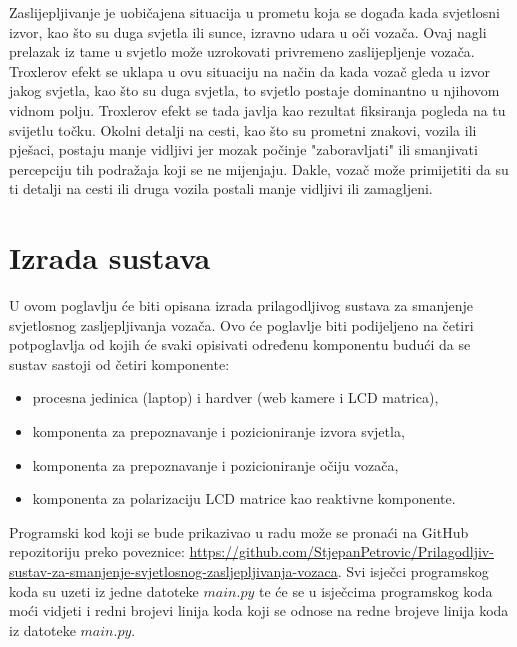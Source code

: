 \documentclass{foi}
\begin{document}
Zaslijepljivanje je uobičajena situacija u prometu koja se događa kada svjetlosni izvor, kao što su duga svjetla ili sunce, izravno udara u oči vozača. Ovaj nagli prelazak iz tame u svjetlo može uzrokovati privremeno zaslijepljenje vozača. Troxlerov efekt se uklapa u ovu situaciju na način da kada vozač gleda u izvor jakog svjetla, kao što su duga svjetla, to svjetlo postaje dominantno u njihovom vidnom polju. Troxlerov efekt se tada javlja kao rezultat fiksiranja pogleda na tu svijetlu točku. Okolni detalji na cesti, kao što su prometni znakovi, vozila ili pješaci, postaju manje vidljivi jer mozak počinje "zaboravljati" ili smanjivati percepciju tih podražaja koji se ne mijenjaju. Dakle, vozač može primijetiti da su ti detalji na cesti ili druga vozila postali manje vidljivi ili zamagljeni. \cite{Autoevolution2022}

\chapter{Izrada sustava}

U ovom poglavlju će biti opisana izrada prilagodljivog sustava za smanjenje svjetlosnog zasljepljivanja vozača. Ovo će poglavlje biti podijeljeno na četiri potpoglavlja od kojih će svaki opisivati određenu komponentu budući da se sustav sastoji od četiri komponente:
\begin{itemize}[noitemsep]
    \item procesna jedinica (laptop) i hardver (web kamere i LCD matrica),
    \item komponenta za prepoznavanje i pozicioniranje izvora svjetla,
    \item komponenta za prepoznavanje i pozicioniranje očiju vozača,
    \item komponenta za polarizaciju LCD matrice kao reaktivne komponente.
\end{itemize}

Programski kod koji se bude prikazivao u radu može se pronaći na GitHub repozitoriju preko poveznice: \href{https://github.com/StjepanPetrovic/Prilagodljiv-sustav-za-smanjenje-svjetlosnog-zasljepljivanja-vozaca}{https://github.com/StjepanPetrovic/Prilagodljiv-sustav-za-smanjenje-svjetlosnog-zasljepljivanja-vozaca}. Svi isječci programskog koda su uzeti iz jedne datoteke \href{https://github.com/StjepanPetrovic/Prilagodljiv-sustav-za-smanjenje-svjetlosnog-zasljepljivanja-vozaca/blob/main/development/main.py}{$main.py$} te će se u isječcima programskog koda moći vidjeti i redni brojevi linija koda koji se odnose na redne brojeve linija koda iz datoteke \href{https://github.com/StjepanPetrovic/Prilagodljiv-sustav-za-smanjenje-svjetlosnog-zasljepljivanja-vozaca/blob/main/development/main.py}{$main.py$}.
\end{document}
